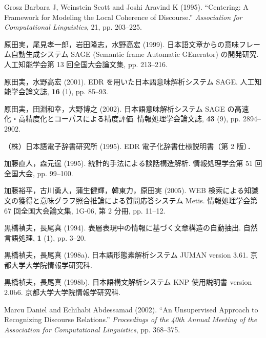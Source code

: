 \documentclass[japanese]{jnlp_1.4}
\begin{document}
\begin{thebibliography}{99}
\item
Grosz Barbara J, Weinstein Scott and Joshi Aravind K (1995). ``Centering: A Framework for Modeling the Local Coherence of Discourse.'' \textit{Association for Computational Linguistics}, 21, pp. 203--225.

\item
原田実，尾見孝一郎，岩田隆志，水野高宏 (1999). 日本語文章からの意味フレーム自動生成システム SAGE (Semantic frame Automatic GEnerator) の開発研究. 人工知能学会第 13 回全国大会論文集, pp. 213--216.

\item
原田実，水野高宏 (2001). EDR を用いた日本語意味解析システム SAGE. 人工知能学会論文誌, \textbf{16} (1), pp. 85--93.

\item
原田実，田淵和幸，大野博之 (2002). 日本語意味解析システム SAGE の高速化・高精度化とコーパスによる精度評価. 情報処理学会論文誌, \textbf{43} (9), pp. 2894--2902.

\item
（株）日本語電子辞書研究所 (1995).  EDR 電子化辞書仕様説明書（第 2 版）．

\item
加藤直人，森元逞 (1995). 統計的手法による談話構造解析. 情報処理学会第 51 回全国大会, pp. 99--100.

\item
加藤裕平，古川勇人，蒲生健輝，韓東力，原田実 (2005). WEB 検索による知識文の獲得と意味グラフ照合推論による質問応答システム Metis. 情報処理学会第 67 回全国大会論文集, 1G-06, 第 2 分冊, pp. 11--12.

\item
黒橋禎夫，長尾真 (1994). 表層表現中の情報に基づく文章構造の自動抽出. 自然言語処理, \textbf{1} (1), pp. 3--20.

\item
黒橋禎夫，長尾真 (1998a). 日本語形態素解析システム JUMAN version 3.61. 京都大学大学院情報学研究科.

\item
黒橋禎夫，長尾真 (1998b). 日本語構文解析システム KNP 使用説明書 version 2.0b6. 京都大学大学院情報学研究科.

\item
Marcu Daniel and Echihabi Abdessamad (2002). ``An Unsupervised Approach to Recognizing Discourse Relations.'' \textit{Proceedings of the 40th Annual Meeting of the Association for Computational Linguistics}, pp. 368--375.


\end{thebibliography}
\end{document}
